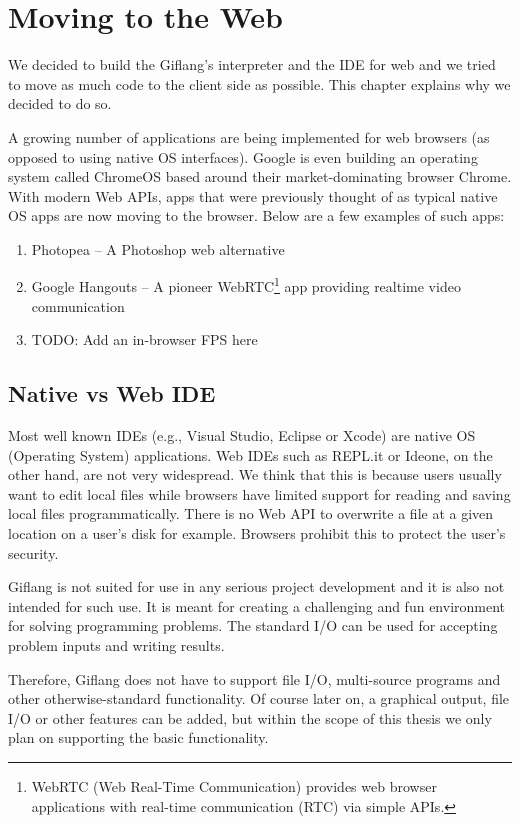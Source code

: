 \chapter{Moving to the Web}
\label{chap2}

We decided to build the Giflang's interpreter and the IDE for web and we tried to move as much code to the client side as possible. This chapter explains
why we decided to do so.

A growing number of applications are being implemented for web browsers (as opposed to using native OS interfaces). Google is even building an
operating system called ChromeOS based around their market-dominating browser Chrome. With modern Web APIs, apps that were previously
thought of as typical native OS apps are now moving to the browser. Below are a few examples of such apps:
\begin{enumerate}
\item Photopea \cite{Photopea} -- A Photoshop web alternative
\item Google Hangouts \cite{Hangouts} -- A pioneer WebRTC\footnote{WebRTC (Web Real-Time Communication) provides web browser 
applications with real-time communication (RTC) via simple APIs.} app providing realtime video communication
\item TODO: Add an in-browser FPS here
\end{enumerate}

\section{Native vs Web IDE}
Most well known IDEs (e.g., Visual Studio, Eclipse or Xcode) are native OS (Operating System) applications. Web IDEs such as REPL.it or Ideone, on the other hand,
are not very widespread. We think that this is because users usually want to edit local files while browsers have limited support for reading
and saving local files programmatically. There is no Web API to overwrite a file at a given location on a user's disk for example.
Browsers prohibit this to protect the user's security.

Giflang is not suited for use in any serious project development and it is also not intended for such use. It is meant for creating a
challenging and fun environment for solving programming problems. The standard I/O can be used for accepting problem inputs and writing results.

Therefore, Giflang does not have to support file I/O, multi-source programs and other otherwise-standard functionality. Of course later
on, a graphical output, file I/O or other features can be added, but within the scope of this thesis we only plan on supporting
the basic functionality.

